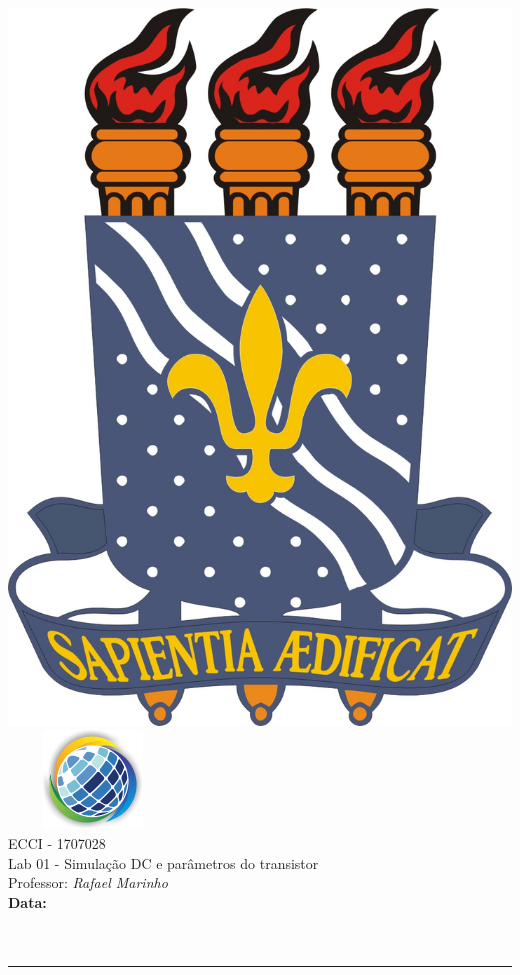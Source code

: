 \documentclass[10pt,addpoints]{exam}%
\newcommand{\class}{ECCI - 1707028}
\newcommand{\examnum}{Lab 01 - Simulação DC e parâmetros do transistor}
\newcommand{\examdate}{}
\begin{document}
\noindent
\begin{minipage}[c]{0.7\linewidth}
\includegraphics[scale=0.14]{../logo/logo-ufpb.jpg}~~~~~\includegraphics[scale=2]{../logo/logo-cear.png}\\[6pt]
{\large \class}\\[4pt]
{\examnum}\\[4pt]
Professor: {\emph{Rafael Marinho}}\\[4pt]
\textbf{Data: \examdate}\\[10pt]
\noindent{}\makebox[3in]{\hrulefill}\\[10pt]
\noindent{}\makebox[3in]{\hrulefill}\\
\end{minipage}
\hfill
\begin{minipage}[t]{0.3\linewidth}
\end{minipage}
\noindent
\rule{\textwidth}{1pt}\vspace{10pt}

\vfill
\end{document}
